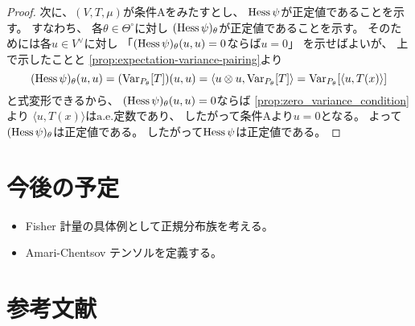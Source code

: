\documentclass[report]{jlreq}
\begin{document}
\begin{proof}
    次に、$(V, T, \mu)$が条件Aをみたすとし、
    $\operatorname{Hess}\psi$が正定値であることを示す。
    すなわち、
    各$\theta \in \Theta^\circ$に対し
    $(\operatorname{Hess}\psi)_\theta$が正定値であることを示す。
    そのためには各$u \in V^\vee$に対し
    「$(\operatorname{Hess}\psi)_\theta(u, u) = 0$ならば$u = 0$」
    を示せばよいが、
    上で示したことと
    \cref{prop:expectation-variance-pairing}より
    \begin{equation}
        (\operatorname{Hess}\psi)_\theta(u, u)
            = (\operatorname{Var}_{P_\theta}[T])(u, u)
            = \langle u \otimes u, \operatorname{Var}_{P_\theta}[T] \rangle
            = \operatorname{Var}_{P_\theta}[\langle u, T(x) \rangle]
    \end{equation}
    と式変形できるから、
    $(\operatorname{Hess}\psi)_\theta(u, u) = 0$ならば
    \cref{prop:zero_variance_condition}より
    $\langle u, T(x) \rangle$は$\text{a.e.}$定数であり、
    したがって条件Aより$u = 0$となる。
    よって$(\operatorname{Hess}\psi)_\theta$は正定値である。
    したがって$\operatorname{Hess}\psi$は正定値である。
\end{proof}



%
\section*{今後の予定}

\begin{itemize}
    \item Fisher 計量の具体例として正規分布族を考える。
    \item Amari-Chentsov テンソルを定義する。
\end{itemize}

%
\section*{参考文献}

\nocite{amari_information_2016}

{
    \renewcommand{\bibsection}{}
    
    
}
\end{document}
